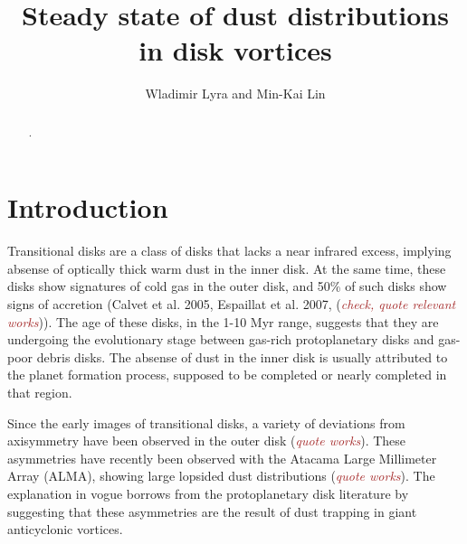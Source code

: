 \documentclass[apj]{emulateapj}
\def\brown#1{\textcolor{brown}{#1}}
\newcommand{\comm}[1]{({\it \brown{#1}})}
\begin{document}

\title{Steady state of dust distributions in disk vortices}
\author{Wladimir Lyra and Min-Kai Lin}

\begin{abstract}
.
\end{abstract}

\section{Introduction}
\label{sect:introduction}

Transitional disks are a class of disks that lacks a near infrared
excess, implying absense of optically thick warm dust in the inner
disk. At the same time, these disks show signatures of cold gas in the
outer disk, and 50\% of such disks show signs of accretion (Calvet et
al. 2005, Espaillat et al. 2007, \comm{check, quote relevant works}). 
The age of these disks, in the 1-10 Myr range, suggests that they are undergoing 
the evolutionary stage between gas-rich protoplanetary disks and gas-poor
debris disks. The absense of dust in the inner disk is usually
attributed to the planet formation process, supposed to be completed
or nearly completed in that region. 

Since the early images of transitional disks, a variety of deviations
from axisymmetry have been observed in the outer disk \comm{quote works}. These asymmetries 
have recently been observed with the Atacama Large Millimeter Array
(ALMA), showing large lopsided dust distributions \comm{quote works}. The explanation in
vogue borrows from the protoplanetary disk literature by suggesting that these asymmetries are the
result of dust trapping in giant anticyclonic vortices. 
\end{document}
